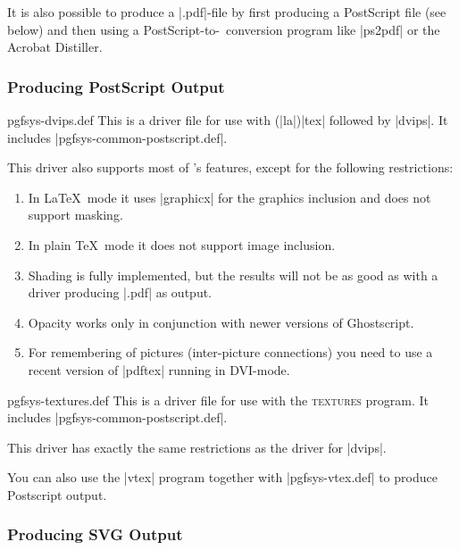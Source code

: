 It is also possible to produce a |.pdf|-file by first producing a PostScript
file (see below) and then using a PostScript-to-\pdf\ conversion program like
|ps2pdf| or the Acrobat Distiller.


\subsubsection{Producing PostScript Output}

\begin{filedescription}{pgfsys-dvips.def}
    This is a driver file for use with (|la|)|tex| followed by |dvips|. It
    includes |pgfsys-common-postscript.def|.

    This driver also supports most of \pgfname's features, except for the
    following restrictions:
    \begin{enumerate}
        \item In \LaTeX\ mode it uses |graphicx| for the graphics inclusion
            and does not support masking.
        \item In plain \TeX\ mode it does not support image inclusion.
        \item Shading is fully implemented, but the results will not be as
            good as with a driver producing |.pdf| as output.
        \item Opacity works only in conjunction with newer versions of
            Ghostscript.
        \item For remembering of pictures (inter-picture connections) you
            need to use a recent version of |pdftex| running in DVI-mode.
    \end{enumerate}
\end{filedescription}

\begin{filedescription}{pgfsys-textures.def}
    This is a driver file for use with the \textsc{textures} program. It
    includes |pgfsys-common-postscript.def|.

    This driver has exactly the same restrictions as the driver for |dvips|.
\end{filedescription}

You can also use the |vtex| program together with |pgfsys-vtex.def| to produce
Postscript output.


\subsubsection{Producing SVG Output}

